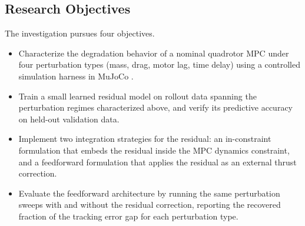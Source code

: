 \documentclass[conference]{IEEEtran}
\begin{document}
\subsection{Research Objectives}
The investigation pursues four objectives.
\begin{itemize}
\item Characterize the degradation behavior of a nominal quadrotor MPC under four perturbation types (mass, drag, motor lag, time delay) using a controlled simulation harness in MuJoCo \cite{todorov2012mujoco}.
\item Train a small learned residual model on rollout data spanning the perturbation regimes characterized above, and verify its predictive accuracy on held-out validation data.
\item Implement two integration strategies for the residual: an in-constraint formulation that embeds the residual inside the MPC dynamics constraint, and a feedforward formulation that applies the residual as an external thrust correction.
\item Evaluate the feedforward architecture by running the same perturbation sweeps with and without the residual correction, reporting the recovered fraction of the tracking error gap for each perturbation type.
\end{itemize}
\end{document}
